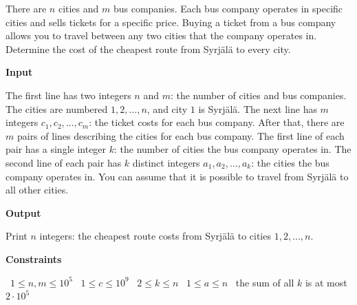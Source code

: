 There are $n$ cities and $m$ bus companies. Each bus company operates in specific cities and sells tickets for a specific price. Buying a ticket from a bus company allows you to travel between any two cities that the company operates in.
Determine the cost of the cheapest route from Syrjälä to every city.

\vspace{0.3cm}\noindent\textbf{Input}

The first line has two integers $n$ and $m$: the number of cities and bus companies. The cities are numbered $1,2,\dots,n$, and city $1$ is Syrjälä.
The next line has $m$ integers $c_1, c_2,\dots, c_m$: the ticket costs for each bus company.
After that, there are $m$ pairs of lines describing the cities for each bus company.
The first line of each pair has a single integer $k$: the number of cities the bus company operates in.
The second line of each pair has $k$ distinct integers $a_1, a_2,\dots, a_k$: the cities the bus company operates in.
You can assume that it is possible to travel from Syrjälä to all other cities.

\vspace{0.3cm}\noindent\textbf{Output}

Print $n$ integers: the cheapest route costs from Syrjälä to cities $1,2,\dots, n$.

\vspace{0.3cm}\noindent\textbf{Constraints}

\textbullet\ $1 \le n, m \le 10^5$
\textbullet\ $1 \le c \le 10^9$
\textbullet\ $2 \le k \le n$
\textbullet\ $1 \le a \le n$
\textbullet\ the sum of all $k$ is at most $2 \cdot 10^5$